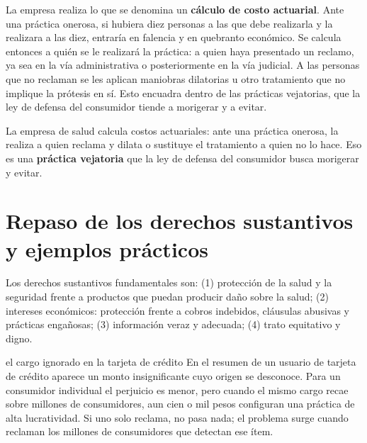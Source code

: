 \documentclass[12pt,oneside]{book}
\begin{document}
La empresa realiza lo que se denomina un \textbf{c\'alculo de costo actuarial}. Ante una pr\'actica onerosa, si hubiera diez personas a las que debe realizarla y la realizara a las diez, entrar\'ia en falencia y en quebranto econ\'omico. Se calcula entonces a qui\'en se le realizar\'a la pr\'actica: a quien haya presentado un reclamo, ya sea en la v\'ia administrativa o posteriormente en la v\'ia judicial. A las personas que no reclaman se les aplican maniobras dilatorias u otro tratamiento que no implique la pr\'otesis en s\'i. Esto encuadra dentro de las pr\'acticas vejatorias, que la ley de defensa del consumidor tiende a morigerar y a evitar.

\begin{important}
La empresa de salud calcula costos actuariales: ante una pr\'actica onerosa, la realiza a quien reclama y dilata o sustituye el tratamiento a quien no lo hace. Eso es una \textbf{pr\'actica vejatoria} que la ley de defensa del consumidor busca morigerar y evitar.
\end{important}

\section{Repaso de los derechos sustantivos y ejemplos pr\'acticos}

Los derechos sustantivos fundamentales son: (1) protecci\'on de la salud y la seguridad frente a productos que puedan producir da\~no sobre la salud; (2) intereses econ\'omicos: protecci\'on frente a cobros indebidos, cl\'ausulas abusivas y pr\'acticas enga\~nosas; (3) informaci\'on veraz y adecuada; (4) trato equitativo y digno.

\begin{example}{el cargo ignorado en la tarjeta de cr\'edito}
En el resumen de un usuario de tarjeta de cr\'edito aparece un monto insignificante cuyo origen se desconoce. Para un consumidor individual el perjuicio es menor, pero cuando el mismo cargo recae sobre millones de consumidores, aun cien o mil pesos configuran una pr\'actica de alta lucratividad. Si uno solo reclama, no pasa nada; el problema surge cuando reclaman los millones de consumidores que detectan ese \'item.
\end{example}
\end{document}
